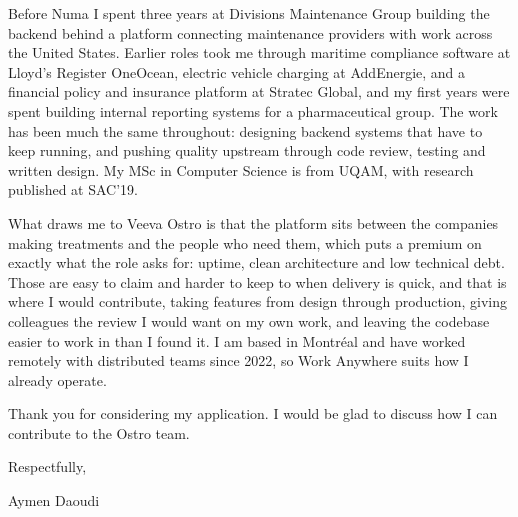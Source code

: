 \documentclass[letterpaper,10pt]{article}
\begin{document}
Before Numa I spent three years at Divisions Maintenance Group building the
backend behind a platform connecting maintenance providers with work across the
United States. Earlier roles took me through maritime compliance software at
Lloyd's Register OneOcean, electric vehicle charging at AddEnergie, and a
financial policy and insurance platform at Stratec Global, and my first years
were spent building internal reporting systems for a pharmaceutical group. The
work has been much the same throughout: designing backend systems that have to
keep running, and pushing quality upstream through code review, testing and
written design. My MSc in Computer Science is from UQAM, with research published
at SAC'19.

What draws me to Veeva Ostro is that the platform sits between the companies
making treatments and the people who need them, which puts a premium on exactly
what the role asks for: uptime, clean architecture and low technical debt. Those
are easy to claim and harder to keep to when delivery is quick, and that is where
I would contribute, taking features from design through production, giving
colleagues the review I would want on my own work, and leaving the codebase
easier to work in than I found it. I am based in Montréal and have worked
remotely with distributed teams since 2022, so Work Anywhere suits how I already
operate.

Thank you for considering my application. I would be glad to discuss how I can
contribute to the Ostro team.

\vspace{6pt}

Respectfully,

\vspace{4pt}

Aymen Daoudi
\end{document}
